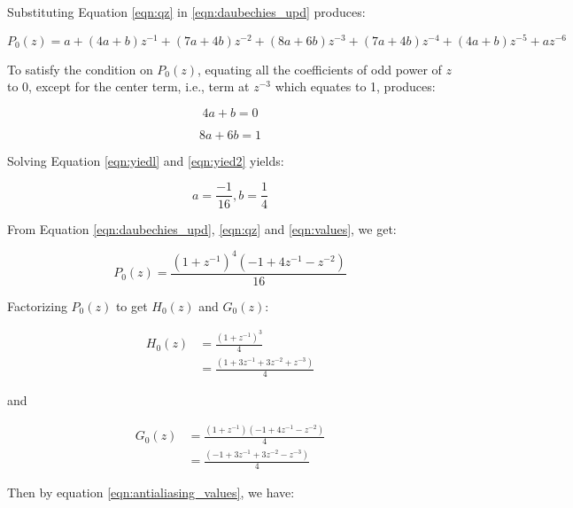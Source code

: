 Substituting Equation \ref{eqn:qz} in \ref{eqn:daubechies_upd} produces:

 \begin{equation}\label{eqn:producer} 
{P_0(z) = a + (4a+b)z^{-1} + (7a + 4b)z^{-2} + (8a+6b)z^{-3} + (7a+4b)z^{-4} + (4a+b)z^{-5} + az^{-6}}
\end{equation}

To satisfy the condition on $P_0(z)$, equating all the coefficients of odd power of $z$ to 0, except for the center term, i.e., term at $z^{-3}$ which equates to 1, produces:

 \begin{equation}\label{eqn:yiedl} 
{4a + b = 0}
\end{equation}


\begin{equation}\label{eqn:yied2} 
{8a + 6b = 1}
\end{equation}

Solving Equation \ref{eqn:yiedl} and \ref{eqn:yied2} yields:

\begin{equation}\label{eqn:values} 
{a = \frac{-1}{16}, b=\frac{1}{4}}
\end{equation}


From Equation \ref{eqn:daubechies_upd}, \ref{eqn:qz} and \ref{eqn:values}, we get:

\begin{equation} 
{P_0(z) = \frac{(1 + z^{-1})^4(-1 + 4z^{-1} - z^{-2})}{16}}
\end{equation}

Factorizing $P_0(z)$ to get $H_0(z)$ and $G_0(z)$:

\begin{equation} \label{eq1}
\begin{split}
H_0(z) & = \frac{(1 + z^{-1})^3}{4} \\
& = \frac{(1 + 3z^{-1} + 3z^{-2} + z^{-3})}{4}
\end{split}
\end{equation}


and


\begin{equation} \label{eq1}
\begin{split}
G_0(z) & = \frac{(1 + z^{-1})(-1 + 4z^{-1} - z^{-2})}{4} \\
& = \frac{(-1 + 3z^{-1} + 3z^{-2} - z^{-3})}{4}
\end{split}
\end{equation}


Then by equation \ref{eqn:antialiasing_values}, we have:


